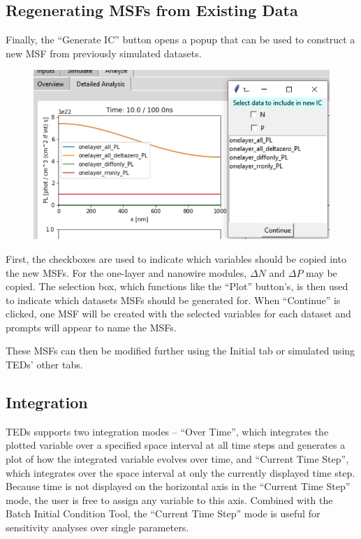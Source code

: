 \documentclass[11pt,letterpaper,titlepage]{article}
\begin{document}
		\subsection {Regenerating MSFs from Existing Data}
		
		\par Finally, the “Generate IC” button opens a popup that can be used to construct a new MSF from previously simulated datasets.
		
		\begin{figure}[H]
			\label{fig:carryover_example}
			\centering
			\includegraphics[scale=1]{"carryover_example"}
		\end{figure}
	
		\par First, the checkboxes are used to indicate which variables should be copied into the new MSFs. For the one-layer and nanowire modules, $\Delta N$ and $\Delta P$ may be copied. The selection box, which functions like the “Plot” button’s, is then used to indicate which datasets MSFs should be generated for. When “Continue” is clicked, one MSF will be created with the selected variables for each dataset and prompts will appear to name the MSFs.
		
		\par These MSFs can then be modified further using the Initial tab or simulated using TEDs’ other tabs.
		
		\subsection {Integration}
		
		\par TEDs supports two integration modes – “Over Time”, which integrates the plotted variable over a specified space interval at all time steps and generates a plot of how the integrated variable evolves over time, and “Current Time Step”, which integrates over the space interval at only the currently displayed time step. Because time is not displayed on the horizontal axis in the “Current Time Step” mode, the user is free to assign any variable to this axis. Combined with the Batch Initial Condition Tool, the “Current Time Step” mode is useful for sensitivity analyses over single parameters.
		
\end{document}
